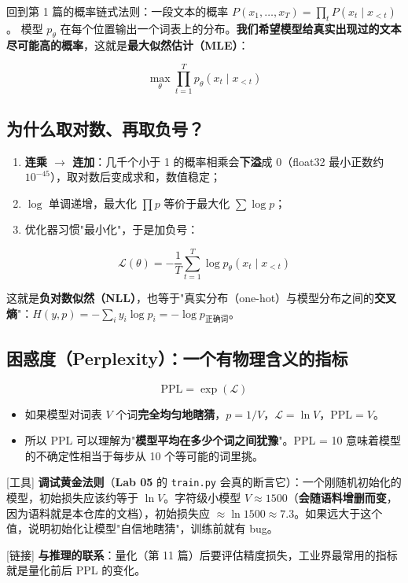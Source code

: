 回到第 1 篇的概率链式法则：一段文本的概率 $P(x_1, \dots, x_T) = \prod_t P(x_t \mid x_{<t})$。
模型 $p_\theta$ 在每个位置输出一个词表上的分布。\textbf{我们希望模型给真实出现过的文本尽可能高的概率}，这就是\textbf{最大似然估计（MLE）}：

\[
\max_\theta \prod_{t=1}^{T} p_\theta(x_t \mid x_{<t})
\]

\subsection{为什么取对数、再取负号？}

\begin{enumerate}
  \item \textbf{连乘 $\rightarrow$ 连加}：几千个小于 1 的概率相乘会\textbf{下溢}成 0（float32 最小正数约 $10^{-45}$），取对数后变成求和，数值稳定；
  \item $\log$ 单调递增，最大化 $\prod p$ 等价于最大化 $\sum \log p$；
  \item 优化器习惯"最小化"，于是加负号：
\end{enumerate}

\[
\mathcal{L}(\theta) = -\frac{1}{T}\sum_{t=1}^{T} \log p_\theta(x_t \mid x_{<t})
\]

这就是\textbf{负对数似然（NLL）}，也等于"真实分布（one-hot）与模型分布之间的\textbf{交叉熵}"：$H(y, p) = -\sum_i y_i \log p_i = -\log p_{\text{正确词}}$。

\subsection{困惑度（Perplexity）：一个有物理含义的指标}

\[
\text{PPL} = \exp(\mathcal{L})
\]

\begin{itemize}
  \item 如果模型对词表 $V$ 个词\textbf{完全均匀地瞎猜}，$p = 1/V$，$\mathcal{L} = \ln V$，$\text{PPL} = V$。
  \item 所以 PPL 可以理解为"\textbf{模型平均在多少个词之间犹豫}"。PPL = 10 意味着模型的不确定性相当于每步从 10 个等可能的词里挑。
\end{itemize}

\begin{noteBox}[核心导读与背景]
{}[工具] \textbf{调试黄金法则}（\textbf{Lab 05} 的 \texttt{train.py} 会真的断言它）：一个刚随机初始化的模型，初始损失应该约等于 $\ln V$。字符级小模型 $V \approx 1500$（\textbf{会随语料增删而变}，因为语料就是本仓库的文档），初始损失应 $\approx \ln 1500 \approx 7.3$。如果远大于这个值，说明初始化让模型"自信地瞎猜"，训练前就有 bug。

{}[链接] \textbf{与推理的联系}：量化（第 11 篇）后要评估精度损失，工业界最常用的指标就是量化前后 PPL 的变化。
\end{noteBox}

